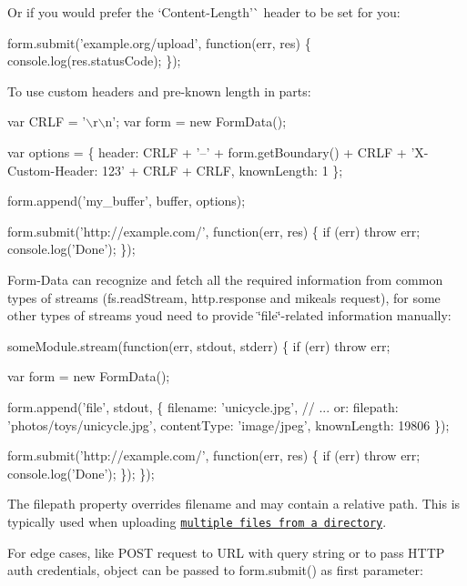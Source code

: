Or if you would prefer the `\textquotesingle{}Content-\/\+Length'\`{} header to be set for you\+:


\begin{DoxyCode}
form.submit('example.org/upload', function(err, res) \{
  console.log(res.statusCode);
\});
\end{DoxyCode}


To use custom headers and pre-\/known length in parts\+:


\begin{DoxyCode}
var CRLF = '\(\backslash\)r\(\backslash\)n';
var form = new FormData();

var options = \{
  header: CRLF + '--' + form.getBoundary() + CRLF + 'X-Custom-Header: 123' + CRLF + CRLF,
  knownLength: 1
\};

form.append('my\_buffer', buffer, options);

form.submit('http://example.com/', function(err, res) \{
  if (err) throw err;
  console.log('Done');
\});
\end{DoxyCode}


Form-\/\+Data can recognize and fetch all the required information from common types of streams ({\ttfamily fs.\+read\+Stream}, {\ttfamily http.\+response} and {\ttfamily mikeal\textquotesingle{}s request}), for some other types of streams you\textquotesingle{}d need to provide \char`\"{}file\char`\"{}-\/related information manually\+:


\begin{DoxyCode}
someModule.stream(function(err, stdout, stderr) \{
  if (err) throw err;

  var form = new FormData();

  form.append('file', stdout, \{
    filename: 'unicycle.jpg', // ... or:
    filepath: 'photos/toys/unicycle.jpg',
    contentType: 'image/jpeg',
    knownLength: 19806
  \});

  form.submit('http://example.com/', function(err, res) \{
    if (err) throw err;
    console.log('Done');
  \});
\});
\end{DoxyCode}


The {\ttfamily filepath} property overrides {\ttfamily filename} and may contain a relative path. This is typically used when uploading \href{https://wicg.github.io/entries-api/#dom-htmlinputelement-webkitdirectory}{\tt multiple files from a directory}.

For edge cases, like P\+O\+ST request to U\+RL with query string or to pass H\+T\+TP auth credentials, object can be passed to {\ttfamily form.\+submit()} as first parameter\+:


